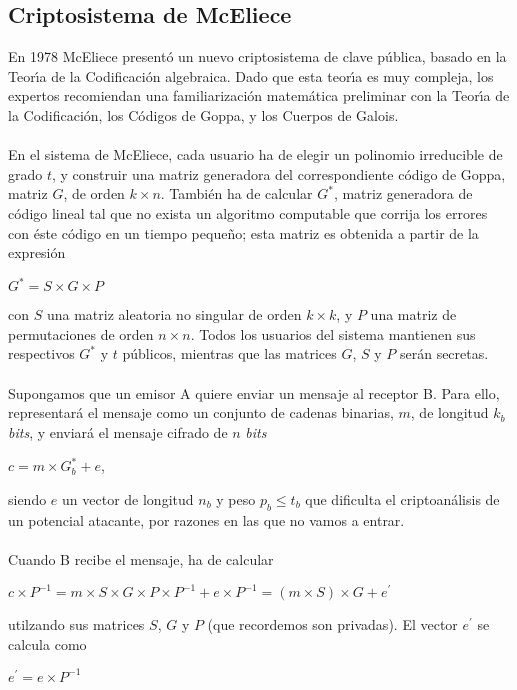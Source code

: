 \subsection{Criptosistema de McEliece}
En 1978 McEliece present\'o un nuevo criptosistema de clave p\'ublica,
basado en la Teor\'{\i}a de la Codificaci\'on algebraica. Dado que
esta teor\'{\i}a es muy compleja, los expertos recomiendan una 
familiarizaci\'on matem\'atica preliminar con la Teor\'{\i}a de la 
Codificaci\'on, los C\'odigos de Goppa, y los Cuerpos de Galois.\\
\\En el sistema de McEliece, cada usuario ha de elegir un polinomio irreducible
de grado $t$, y construir una matriz generadora del correspondiente c\'odigo
de Goppa, matriz $G$, de orden $k\times n$. Tambi\'en ha de calcular 
$G^{\ast}$, matriz
generadora de c\'odigo lineal tal que no exista un algoritmo computable
que corrija los errores con \'este c\'odigo en un tiempo peque\~no; esta matriz
es obtenida a partir de la expresi\'on
\begin{center}
$G^{\ast}=S\times G\times P$
\end{center}
con $S$ una matriz aleatoria no singular de orden $k\times k$, y $P$ una matriz
de permutaciones de orden $n\times n$.
Todos los usuarios del sistema mantienen sus respectivos $G^{\ast}$ y $t$ 
p\'ublicos, mientras que las matrices $G$, $S$ y $P$ ser\'an secretas.\\
\\Supongamos que un emisor A quiere enviar un mensaje al receptor B.
Para ello, representar\'a el mensaje como un conjunto de cadenas binarias,
$m$, de longitud $k_{b}$ {\it bits}, y enviar\'a el mensaje cifrado de $n$ {\it 
bits}
\begin{center}
$c=m\times G_{b}^{*}+e$,
\end{center}
siendo $e$ un vector de longitud $n_{b}$ y peso $p_{b}\leq t_{b}$ que dificulta 
el criptoan\'alisis de un potencial atacante, por razones en las que no vamos a 
entrar.\\
\\Cuando B recibe el mensaje, ha de calcular
\begin{center}
$c\times P^{-1}=m\times S\times G\times P\times P^{-1}+e\times P^{-1} =(m\times 
S)\times G+e^{\prime}$
\end{center}
utilzando sus matrices $S$, $G$ y $P$ (que recordemos son privadas). El vector
$e^{\prime}$ se calcula como
\begin{center}
$e^{\prime}=e\times P^{-1}$
\end{center}
